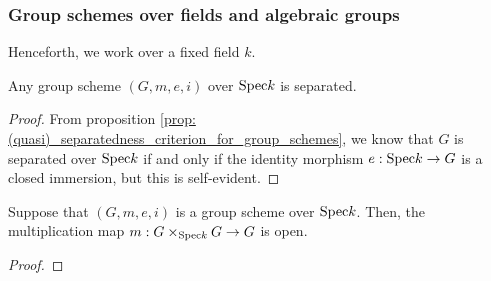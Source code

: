         \subsubsection{Group schemes over fields and algebraic groups}
            \begin{convention}
                Henceforth, we work over a fixed field $k$.
            \end{convention}
            
            \begin{proposition} \label{prop: group_schemes_over_fields_are_separated}
                Any group scheme $(G, m, e, i)$ over $\mathrm{Spec} k$ is separated. 
            \end{proposition}
                \begin{proof}
                    From proposition \ref{prop: (quasi)_separatedness_criterion_for_group_schemes}, we know that $G$ is separated over $\mathrm{Spec} k$ if and only if the identity morphism $e: \mathrm{Spec} k \to G$ is a closed immersion, but this is self-evident.
                \end{proof}
            
            \begin{proposition} \label{prop: multiplication_maps_of_group_schemes_over_fields_are_open}
                Suppose that $(G, m, e, i)$ is a group scheme over $\mathrm{Spec} k$. Then, the multiplication map $m: G \x_{\Spec k} G \to G$ is open.
            \end{proposition}
                \begin{proof}
                    
                \end{proof}
            
